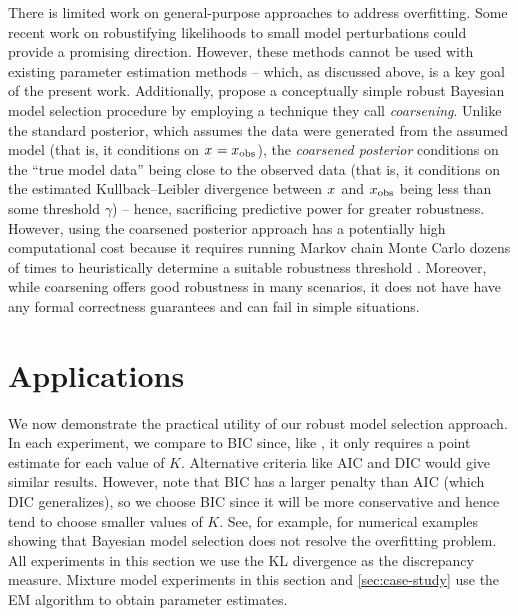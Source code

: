 There is limited work on general-purpose approaches to address overfitting.
Some recent work on robustifying likelihoods to small model perturbations \citep{Chakraborty:2023,Dewaskar:2023,Wu:2024} could provide a promising direction.
However, these methods cannot be used with existing parameter estimation methods -- which, as discussed above, is a key goal of the present work.
Additionally, \citet{Miller:2019} propose a conceptually simple robust Bayesian model selection
procedure by employing a technique they call \emph{coarsening}.
Unlike the standard posterior, which assumes the data were generated from the assumed model (that is, it conditions on $x_{} = x_{\mathrm{obs}}$), the \emph{coarsened posterior} conditions on the ``true model data'' being close to the observed data
(that is, it conditions on the estimated Kullback--Leibler divergence between $x_{}$ and $x_{\mathrm{obs}}$ being less than some threshold $\gamma$) -- hence, sacrificing predictive power for greater robustness.
However, using the coarsened posterior approach has a potentially high computational cost because
it requires running Markov chain Monte Carlo dozens of times to heuristically determine a suitable robustness threshold \citep{Miller:2019,Xue:2024}.
Moreover, while coarsening offers good robustness in many scenarios, it does not have have any formal correctness guarantees
and can fail in simple situations.

\section{Applications}
\label{sec:experiments}

We now demonstrate the practical utility of our robust model selection approach.
In each experiment, we compare to BIC since, like \methodname, it only requires a point estimate for each value of $K$.
Alternative criteria like AIC and DIC would give similar results.
However, note that BIC has a larger penalty than AIC (which DIC generalizes), so we choose BIC since it will be more conservative and hence tend to choose smaller values of $K$.
See, for example, \citet{Miller:2019,Xue:2024,Cai:2021} for numerical examples showing that Bayesian model selection does
not resolve the overfitting problem.
All experiments in this section we use the KL divergence as the discrepancy measure.
Mixture model experiments in this section and \cref{sec:case-study} use the EM algorithm to obtain parameter estimates.

